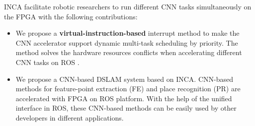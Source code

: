 

INCA facilitate robotic researchers to run different CNN tasks simultaneously on the FPGA with the following contributions:
\begin{itemize}
\item We propose a \textbf{virtual-instruction-based} interrupt method to make the CNN accelerator support dynamic multi-task scheduling by priority. The method solves the hardware resources conflicts when accelerating different CNN tasks on ROS \cite{quigley2009ros}.
\item We propose a CNN-based DSLAM system based on INCA. CNN-based methods for feature-point extraction (FE) and place recognition (PR) are accelerated with FPGA on ROS platform. With the help of the unified interface in ROS, these CNN-based methods can be easily used by other developers in different applications.
\end{itemize}

